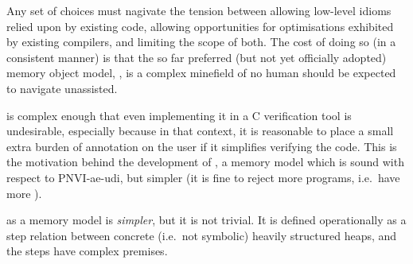 Any set of choices must nagivate the tension between allowing
low-level idioms relied upon by existing code, allowing opportunities for
optimisations exhibited by existing compilers, and limiting the scope of both.
The cost of doing so (in a consistent manner) is that the so far preferred (but
not yet officially adopted) memory object model,
, is a
complex minefield of  no human should be expected to navigate
unassisted.

 is complex enough that even implementing it in a C
verification tool is undesirable, especially because in that context, it is
reasonable to place a small extra burden of annotation on the user if it
simplifies verifying the code. This is the motivation behind the development of
, a memory model which is sound with respect
to PNVI-ae-udi, but simpler (it is fine to reject more programs, i.e.\
have more ).

 as a memory model is \emph{simpler}, but it is not trivial. It is
defined operationally as a step relation between concrete (i.e.\ not symbolic)
heavily structured heaps, and the steps have complex premises.

